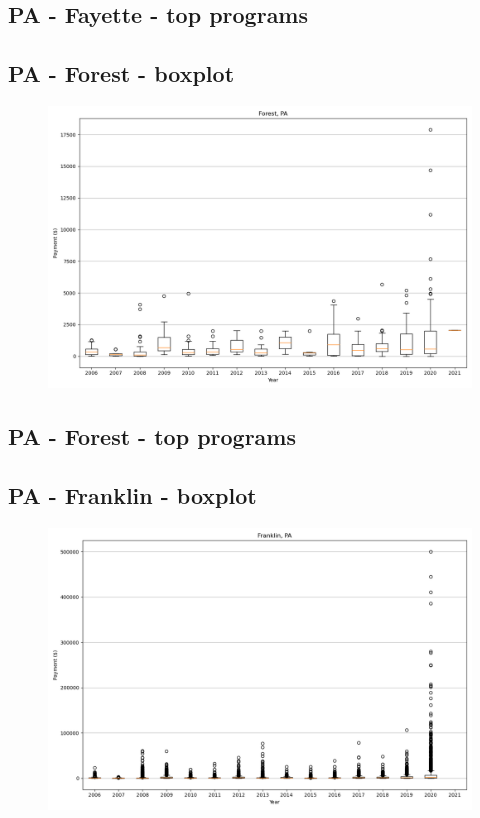 \subsection*{PA - Fayette - top programs}

\newpage
\subsection*{PA - Forest - boxplot}
\begin{figure}[h]
\centering
\includegraphics[width=7in]{../output/boxplots/counties/Forest-PA_boxplot.png}
\end{figure}


\subsection*{PA - Forest - top programs}

\newpage
\subsection*{PA - Franklin - boxplot}
\begin{figure}[h]
\centering
\includegraphics[width=7in]{../output/boxplots/counties/Franklin-PA_boxplot.png}
\end{figure}


